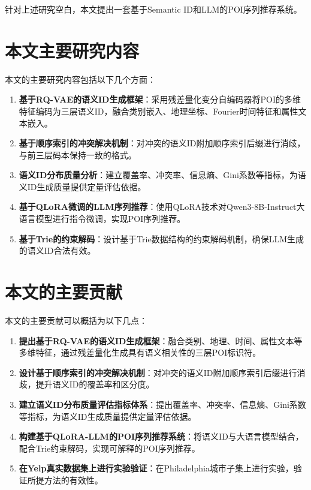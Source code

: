 针对上述研究空白，本文提出一套基于Semantic ID和LLM的POI序列推荐系统。

\section{本文主要研究内容}
\label{sec:content}

本文的主要研究内容包括以下几个方面：

\begin{enumerate}
    \item \textbf{基于RQ-VAE的语义ID生成框架}：采用残差量化变分自编码器将POI的多维特征编码为三层语义ID，融合类别嵌入、地理坐标、Fourier时间特征和属性文本嵌入。
    \item \textbf{基于顺序索引的冲突解决机制}：对冲突的语义ID附加顺序索引后缀进行消歧，与前三层码本保持一致的格式。
    \item \textbf{语义ID分布质量分析}：建立覆盖率、冲突率、信息熵、Gini系数等指标，为语义ID生成质量提供定量评估依据。
    \item \textbf{基于QLoRA微调的LLM序列推荐}：使用QLoRA技术对Qwen3-8B-Instruct大语言模型进行指令微调，实现POI序列推荐。
    \item \textbf{基于Trie的约束解码}：设计基于Trie数据结构的约束解码机制，确保LLM生成的语义ID合法有效。
\end{enumerate}

\section{本文的主要贡献}
\label{sec:contribution}

本文的主要贡献可以概括为以下几点：

\begin{enumerate}
    \item \textbf{提出基于RQ-VAE的语义ID生成框架}：融合类别、地理、时间、属性文本等多维特征，通过残差量化生成具有语义相关性的三层POI标识符。
    \item \textbf{设计基于顺序索引的冲突解决机制}：对冲突的语义ID附加顺序索引后缀进行消歧，提升语义ID的覆盖率和区分度。
    \item \textbf{建立语义ID分布质量评估指标体系}：提出覆盖率、冲突率、信息熵、Gini系数等指标，为语义ID生成质量提供定量评估依据。
    \item \textbf{构建基于QLoRA-LLM的POI序列推荐系统}：将语义ID与大语言模型结合，配合Trie约束解码，实现可解释的POI序列推荐。
    \item \textbf{在Yelp真实数据集上进行实验验证}：在Philadelphia城市子集上进行实验，验证所提方法的有效性。
\end{enumerate}

